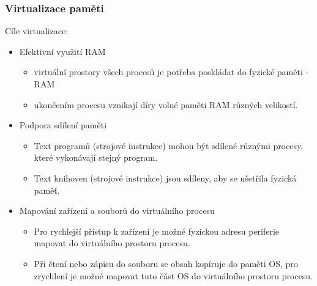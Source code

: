 \documentclass{beamer}
\begin{document}
\begin{frame}
\frametitle{Virtualizace paměti}

Cíle virtualizace:
\begin{itemize}
 \item Efektivní využití RAM
 \begin{itemize}
 \item virtuální prostory všech procesů je potřeba poskládat do fyzické paměti - RAM
 \item ukončením procesu vznikají díry volné paměti RAM různých velikostí.
\end{itemize}
\item Podpora sdílení paměti
 \begin{itemize}
 \item Text programů (strojové instrukce) mohou být sdílené různými procesy, které vykonávají stejný program.
 \item Text knihoven (strojové instrukce) jsou sdíleny, aby se ušetřila fyzická paměť.
 \end{itemize}
\item Mapování zařízení a souborů do virtuálního procesu
 \begin{itemize}
 \item Pro rychlejší přístup k zařízení je možné fyzickou adresu periferie mapovat do virtuálního prostoru procesu.
 \item Při čtení nebo zápisu do souboru se obsah kopíruje do paměti OS, pro zrychlení je možné mapovat tuto část OS do virtuálního prostoru procesu.
 \end{itemize}
\end{itemize}
\end{frame}
\end{document}
